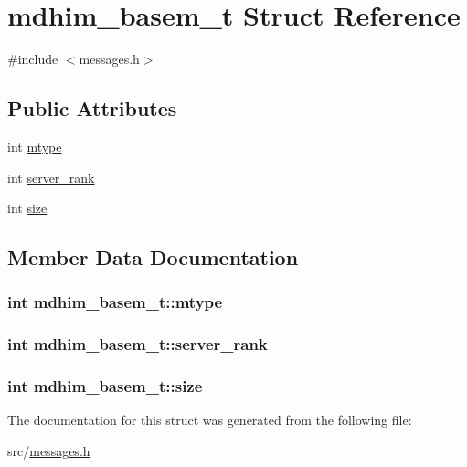 \hypertarget{structmdhim__basem__t}{\section{mdhim\-\_\-basem\-\_\-t Struct Reference}
\label{de/df7/structmdhim__basem__t}
}


{\ttfamily \#include $<$messages.\-h$>$}

\subsection*{Public Attributes}
\begin{DoxyCompactItemize}
\item 
int \hyperlink{structmdhim__basem__t_a3697e7a3c6c37abc3f267277123b02b6}{mtype}
\item 
int \hyperlink{structmdhim__basem__t_ab4a85c0bf2c05d68805fe5126d670b94}{server\-\_\-rank}
\item 
int \hyperlink{structmdhim__basem__t_a42bc98b866212b4cc4c8874327434c0e}{size}
\end{DoxyCompactItemize}


\subsection{Member Data Documentation}
\hypertarget{structmdhim__basem__t_a3697e7a3c6c37abc3f267277123b02b6}{
\subsubsection[{mtype}]{\setlength{\rightskip}{0pt plus 5cm}int mdhim\-\_\-basem\-\_\-t\-::mtype}}\label{de/df7/structmdhim__basem__t_a3697e7a3c6c37abc3f267277123b02b6}
\hypertarget{structmdhim__basem__t_ab4a85c0bf2c05d68805fe5126d670b94}{
\subsubsection[{server\-\_\-rank}]{\setlength{\rightskip}{0pt plus 5cm}int mdhim\-\_\-basem\-\_\-t\-::server\-\_\-rank}}\label{de/df7/structmdhim__basem__t_ab4a85c0bf2c05d68805fe5126d670b94}
\hypertarget{structmdhim__basem__t_a42bc98b866212b4cc4c8874327434c0e}{
\subsubsection[{size}]{\setlength{\rightskip}{0pt plus 5cm}int mdhim\-\_\-basem\-\_\-t\-::size}}\label{de/df7/structmdhim__basem__t_a42bc98b866212b4cc4c8874327434c0e}


The documentation for this struct was generated from the following file\-:\begin{DoxyCompactItemize}
\item 
src/\hyperlink{messages_8h}{messages.\-h}\end{DoxyCompactItemize}
